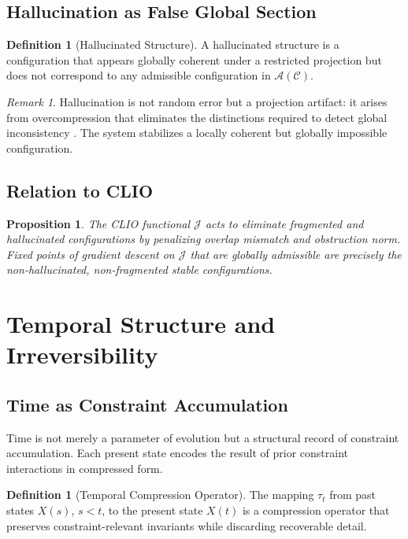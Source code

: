 \documentclass[11pt]{article}
\theoremstyle{plain}
\newtheorem{proposition}[theorem]{Proposition}
\theoremstyle{definition}
\newtheorem{definition}[theorem]{Definition}
\theoremstyle{remark}
\newtheorem{remark}[theorem]{Remark}
\begin{document}
\subsection{Hallucination as False Global Section}

\begin{definition}[Hallucinated Structure]
A hallucinated structure is a configuration that appears globally coherent
under a restricted projection but does not correspond to any admissible
configuration in $\mathcal{A}(\mathcal{C})$.
\end{definition}

\begin{remark}
Hallucination is not random error but a projection artifact: it arises
from overcompression that eliminates the distinctions required to detect
global inconsistency \cite{clark2013whatever,friston2010free}. The system
stabilizes a locally coherent but globally impossible configuration.
\end{remark}

\subsection{Relation to CLIO}

\begin{proposition}
The CLIO functional $\mathcal{J}$ acts to eliminate fragmented and
hallucinated configurations by penalizing overlap mismatch and
obstruction norm. Fixed points of gradient descent on $\mathcal{J}$
that are globally admissible are precisely the non-hallucinated,
non-fragmented stable configurations.
\end{proposition}

\section{Temporal Structure and Irreversibility}

\subsection{Time as Constraint Accumulation}

Time is not merely a parameter of evolution but a structural record of
constraint accumulation. Each present state encodes the result of prior
constraint interactions in compressed form.

\begin{definition}[Temporal Compression Operator]
The mapping $\tau_t$ from past states $X(s)$, $s < t$, to the present
state $X(t)$ is a compression operator that preserves constraint-relevant
invariants while discarding recoverable detail.
\end{definition}
\end{document}
